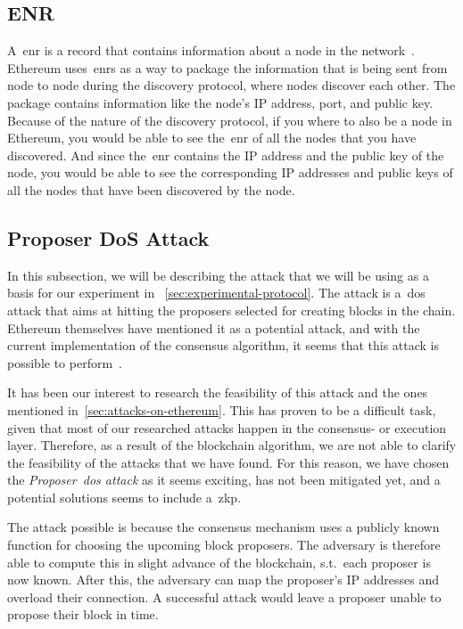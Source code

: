 \subsection{ENR}\label{subsec:enr}
A~\gls{enr} is a record that contains information about a node in the network~\cite{EIP-778:Ethereum-Node-Records}.
Ethereum uses~\glspl{enr} as a way
to package the information that is being sent from node to node during the discovery protocol,
where nodes discover each other.
The package contains information like the node's IP address, port, and public key.
Because of the nature of the discovery protocol, if you where to also be a node in Ethereum,
you would be able to see the~\gls{enr} of all the nodes that you have discovered.
And since the~\gls{enr} contains the IP address and the public key of the node,
you would be able
to see the corresponding IP addresses and public keys of all the nodes that have been discovered by the node.

\subsection{Proposer DoS Attack}\label{subsec:proposer-dos-attack}
In this subsection, we will be describing the attack that we will be using as a basis for our experiment in ~\autoref{sec:experimental-protocol}.
The attack is a~\gls{dos} attack that aims at hitting the proposers selected for creating blocks in the chain.
Ethereum themselves have mentioned it as a potential attack, and with the current implementation of the consensus algorithm, it seems that this attack is possible to perform~\cite{EthereumSSLE2024,EthereumAttackDefense2024}.

It has been our interest to research the feasibility of this attack and the ones mentioned in~\autoref{sec:attacks-on-ethereum}.
This has proven to be a difficult task, given that most of our researched attacks happen in the consensus- or execution layer.
Therefore, as a result of the blockchain algorithm, we are not able to clarify the feasibility of the attacks that we have found.
For this reason, we have chosen the \textit{Proposer~\gls{dos} attack} as it seems exciting, has not been mitigated yet, and a potential solutions seems to include a~\gls{zkp}.

The attack possible is because the consensus mechanism uses a publicly known function for choosing the upcoming block proposers.
The adversary is therefore able to compute this in slight advance of the blockchain, s.t.\ each proposer is now known.
After this, the adversary can map the proposer's IP addresses and overload their connection.
A successful attack would leave a proposer unable to propose their block in time.